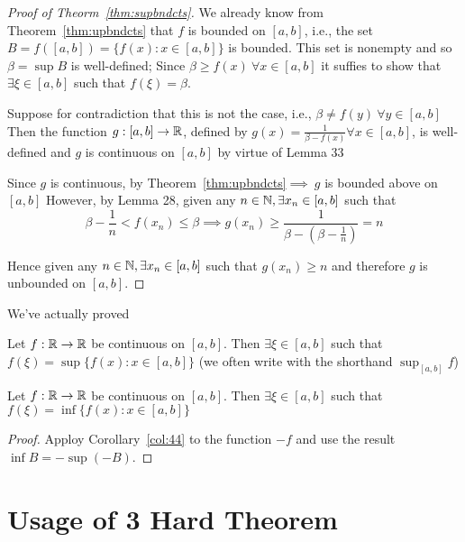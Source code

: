 \begin{proof}[Proof of Theorm~\ref{thm:supbndcts}]
    We already know from Theorem~\ref{thm:upbndcts} that $f$ is bounded on $\left[a, b\right]$,
    i.e., the set $B = f(\left[a, b\right]) = \{f(x): x \in \left[a, b\right]\}$ is bounded.
    This set is nonempty and so $\beta = \sup B$ is well-defined;
    Since $\beta \geq f(x)\ \forall x \in \left[a, b\right]$ it suffies to show that
    $\exists \xi \in \left[a, b\right]$ such that $f(\xi) = \beta$.
    
    Suppose for contradiction that this is not the case, i.e., 
    $\beta \neq f(y)\ \forall y \in \left[a, b\right]$ Then the function $g: \left[a, b\right] \to \mathbb R$,
    defined by $g(x) = \frac{1}{\beta - f(x)} \forall x \in \left[a, b\right]$,
    is well-defined and $g$ is continuous on $\left[a, b\right]$ by virtue of Lemma 33

    Since $g$ is continuous, by Theorem~\ref{thm:upbndcts}$\implies\ g$ is bounded above on $\left[a, b\right]$
    However, by Lemma 28, given any $n \in \mathbb N, \exists x_n \in \left[a, b\right]$ such that 
    $$\beta - \frac{1}{n} < f(x_n)\leq \beta \implies g(x_n) \geq \frac{1}{\beta - \left(\beta-\frac{1}{n}\right)} = n$$ 

    Hence given any $n \in \mathbb N, \exists x_n \in \left[a, b\right]$ such that $g(x_n) \geq n$ and
    therefore $g$ is unbounded on $\left[a, b\right]$.
\end{proof}

We've actually proved
\begin{corollary}\label{col:44}
    Let $f: \mathbb R \to \mathbb R$ be continuous on $\left[a, b\right]$. Then $\exists\xi \in \left[a, b\right]$ such that
    $f(\xi) = \sup\{f(x) : x \in \left[a, b\right]\}$ (we often write with the shorthand $\sup_{\left[a, b\right]} f$)
\end{corollary}

\begin{corollary}
    Let $f: \mathbb R \to \mathbb R$ be continuous on $\left[a, b\right]$. Then $\exists \xi \in \left[a, b\right]$ such that
    $f(\xi) = \inf\{f(x) : x \in \left[a, b\right]\}$ 
\end{corollary}

\begin{proof}
    Apploy Corollary~\ref{col:44} to the function $-f$ and use the result $\inf B = -\sup(-B)$.
\end{proof}

\section{Usage of 3 Hard Theorem}

